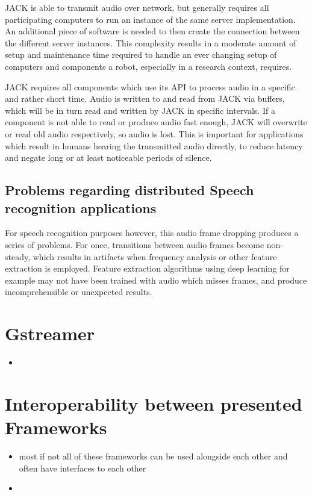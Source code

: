 JACK is able to transmit audio over network, but generally requires all participating computers to run an instance of the same server implementation. 
An additional piece of software is needed to then create the connection between the different server instances. 
This complexity results in a moderate amount of setup and maintenance time required to handle an ever changing setup of computers and components a robot, especially in a research context, requires.

JACK requires all components which use its API to process audio in a specific and rather short time. 
Audio is written to and read from JACK via buffers, which will be in turn read and written by JACK in specific intervals.
If a component is not able to read or produce audio fast enough, JACK will overwrite or read old audio respectively, so audio is lost. 
This is important for applications which result in humans hearing the transmitted audio directly, to reduce latency and negate long or at least noticeable periods of silence.

\subsection{Problems regarding distributed Speech recognition applications}
For speech recognition purposes however, this audio frame dropping produces a series of problems. 
For once, transitions between audio frames become non-steady, which results in artifacts when frequency analysis or other feature extraction is employed.
Feature extraction algorithms using deep learning for example may not have been trained with audio which misses frames, and produce incomprehensible or unexpected results.


\section{Gstreamer}

\begin{itemize}
	\item 
\end{itemize}


\section{Interoperability between presented Frameworks}
\begin{itemize}
	\item most if not all of these frameworks can be used alongside each other and often have interfaces to each other
	\item 
\end{itemize}


